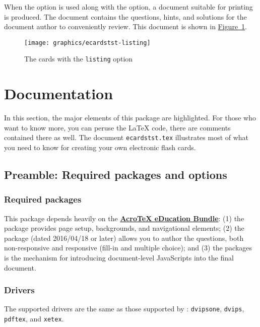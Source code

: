 \documentclass{article}
\begin{document}
When the  option is used along with the  option, a
document suitable for printing is produced. The document contains the
questions, hints, and solutions for the document author to conveniently
review. This document is shown in \hyperref[fig:ecards-listing]{Figure~\ref*{fig:ecards-listing}}.

\begin{figure}[htb]\centering\setlength{\fboxsep}{0pt}\fbox
{\texttt{[image: graphics/ecardstst-listing]}}
  \caption{The cards with the \texttt{listing} option}\label{fig:ecards-listing}
\end{figure}

\section{Documentation}

In this section, the major elements of this package are highlighted. For those
who want to know more, you can peruse the {\LaTeX} code, there are comments
contained there as well.  The document \texttt{ecardstst.tex} illustrates
most of what you need to know for creating your own electronic flash cards.

\subsection{Preamble: Required packages and options}

\subsubsection{Required packages}

This package depends heavily on the
\textbf{\href{http://www.math.uakron.edu/~dpstory/webeq.html}
{Acro\negthinspace\TeX{} eDucation Bundle}}: (1) the  package
provides page setup, backgrounds, and navigational elements; (2) the
 package (dated 2016/04/18 or later) allows you to author the
questions, both non-responsive and responsive (fill-in and multiple choice);
and (3) the  packages is the mechanism for introducing
document-level JavaScripts into the final document.

\subsubsection{Drivers}

The supported drivers are the same as those supported by :
\texttt{dvipsone}, \texttt{dvips}, \texttt{pdftex}, and \texttt{xetex}.
\end{document}
